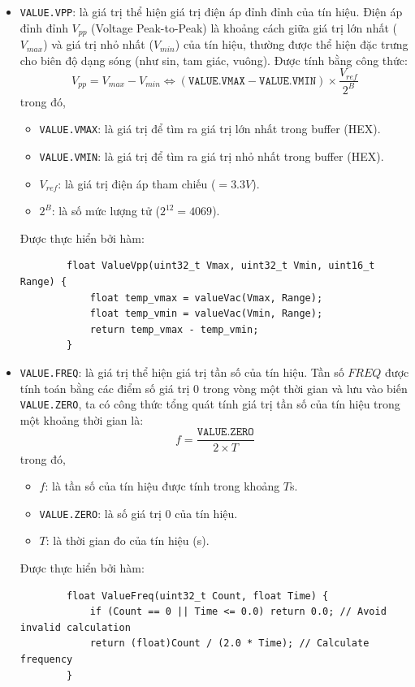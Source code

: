 \begin{itemize}[label = -]
	\item \texttt{VALUE.VPP}: là giá trị thể hiện giá trị điện áp đỉnh đỉnh của tín hiệu. Điện áp đỉnh đỉnh $V_{pp}$ (Voltage Peak-to-Peak) là khoảng cách giữa giá trị lớn nhất ($V_{max}$) và giá trị nhỏ nhất ($V_{min}$) của tín hiệu, thường được thể hiện đặc trưng cho biên độ dạng sóng (như sin, tam giác, vuông). Được tính bằng công thức: \[ V_{pp} = V_{max} - V_{min} \Leftrightarrow (\texttt{VALUE.VMAX} - \texttt{VALUE.VMIN}) \times \dfrac{V_{ref}}{2^{B}}\]
	trong đó, 
	\begin{itemize}[label = +]
		\item \texttt{VALUE.VMAX}: là giá trị để tìm ra giá trị lớn nhất trong buffer (HEX).
		\item \texttt{VALUE.VMIN}: là giá trị để tìm ra giá trị nhỏ nhất trong buffer (HEX).
		\item $V_{ref}$: là giá trị điện áp tham chiếu ($=3.3V$).
		\item $2^{B}$: là số mức lượng tử ($2^{12} = 4069$).
	\end{itemize}
	Được thực hiển bởi hàm:
	
	\begin{lstlisting}
		float ValueVpp(uint32_t Vmax, uint32_t Vmin, uint16_t Range) {
			float temp_vmax = valueVac(Vmax, Range);
			float temp_vmin = valueVac(Vmin, Range);
			return temp_vmax - temp_vmin;
		}
	\end{lstlisting}
	
	\item \texttt{VALUE.FREQ}: là giá trị thể hiện giá trị tần số của tín hiệu. Tần số $FREQ$ được tính toán bằng các điểm số giá trị 0 trong vòng một thời gian và lưu vào biến \texttt{VALUE.ZERO}, ta có công thức tổng quát tính giá trị tần số của tín hiệu trong một khoảng thời gian là: \[ f = \dfrac{\texttt{VALUE.ZERO}}{2\times T} \]
	trong đó,
	\begin{itemize}[label=-]
		\item $f$: là tần số của tín hiệu được tính trong khoảng $T$s.
		\item \texttt{VALUE.ZERO}: là số giá trị 0 của tín hiệu.
		\item $T$: là thời gian đo của tín hiệu (s).
	\end{itemize}
	Được thực hiển bởi hàm:
	
	\begin{lstlisting}
		float ValueFreq(uint32_t Count, float Time) {
			if (Count == 0 || Time <= 0.0) return 0.0; // Avoid invalid calculation
			return (float)Count / (2.0 * Time); // Calculate frequency
		}
	\end{lstlisting}
\end{itemize}


